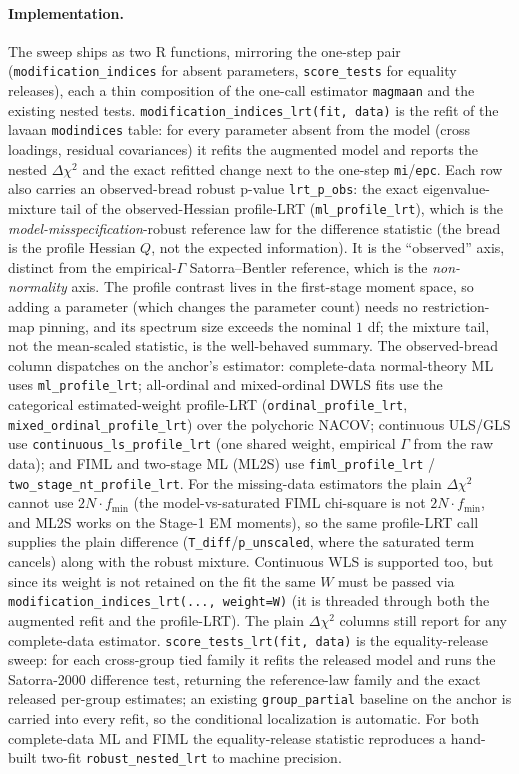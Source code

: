 \documentclass[11pt]{article}
\theoremstyle{plain}
\theoremstyle{remark}
\begin{document}
\paragraph{Implementation.} The sweep ships as two R functions, mirroring the
one-step pair (\texttt{modification\_indices} for absent parameters,
\texttt{score\_tests} for equality releases), each a thin composition of the
one-call estimator \texttt{magmaan} and the existing nested tests.
\texttt{modification\_indices\_lrt(fit, data)} is the refit of the lavaan
\texttt{modindices} table: for every parameter absent from the model (cross
loadings, residual covariances) it refits the augmented model and reports the
nested $\Delta\chi^2$ and the exact refitted change next to the one-step
\texttt{mi}/\texttt{epc}. Each row also carries an observed-bread robust p-value
\texttt{lrt\_p\_obs}: the exact eigenvalue-mixture tail of the observed-Hessian
profile-LRT (\texttt{ml\_profile\_lrt}), which is the
\emph{model-misspecification}-robust reference law for the difference statistic
(the bread is the profile Hessian $Q$, not the expected information). It is the
``observed'' axis, distinct from the empirical-$\Gamma$ Satorra--Bentler
reference, which is the \emph{non-normality} axis. The profile contrast lives in
the first-stage moment space, so adding a parameter (which changes the parameter
count) needs no restriction-map pinning, and its spectrum size exceeds the
nominal $1$ df; the mixture tail, not the mean-scaled statistic, is the
well-behaved summary. The observed-bread column dispatches on the anchor's
estimator: complete-data normal-theory ML uses \texttt{ml\_profile\_lrt};
all-ordinal and mixed-ordinal DWLS fits use the categorical estimated-weight
profile-LRT (\texttt{ordinal\_profile\_lrt}, \texttt{mixed\_ordinal\_profile\_lrt})
over the polychoric NACOV; continuous ULS/GLS use
\texttt{continuous\_ls\_profile\_lrt} (one shared weight, empirical $\Gamma$ from
the raw data); and FIML and two-stage ML (ML2S) use \texttt{fiml\_profile\_lrt} /
\texttt{two\_stage\_nt\_profile\_lrt}. For the missing-data estimators the plain
$\Delta\chi^2$ cannot use $2N\!\cdot\!f_{\min}$ (the model-vs-saturated FIML
chi-square is not $2N\!\cdot\!f_{\min}$, and ML2S works on the Stage-1 EM
moments), so the same profile-LRT call supplies the plain difference
(\texttt{T\_diff}/\texttt{p\_unscaled}, where the saturated term cancels) along
with the robust mixture. Continuous WLS is supported too, but since its weight is
not retained on the fit the same $W$ must be passed via
\texttt{modification\_indices\_lrt(..., weight=W)} (it is threaded through both the
augmented refit and the profile-LRT). The plain $\Delta\chi^2$ columns still
report for any complete-data estimator.
\texttt{score\_tests\_lrt(fit, data)} is the
equality-release sweep: for each cross-group tied family it refits the released
model and runs the Satorra-2000 difference test, returning the reference-law
family and the exact released per-group estimates; an existing
\texttt{group\_partial} baseline on the anchor is carried into every refit, so
the conditional localization is automatic. For both complete-data ML and FIML the
equality-release statistic reproduces a hand-built two-fit
\texttt{robust\_nested\_lrt} to machine precision.
\end{document}
